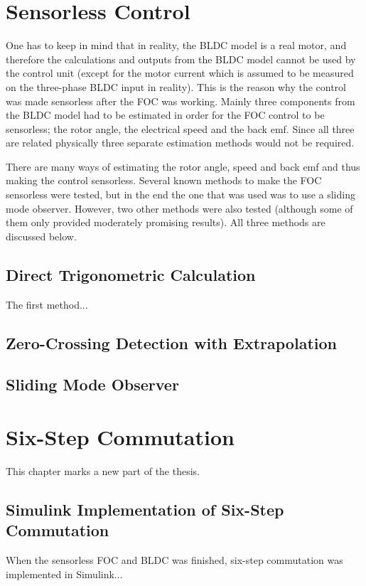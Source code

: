 \documentclass{LTHthesis}
\begin{document}
\chapter{Sensorless Control}
One has to keep in mind that in reality, the BLDC model is a real motor, and therefore the calculations and outputs from the BLDC model cannot be used by the control unit (except for the motor current which is assumed to be measured on the three-phase BLDC input in reality). This is the reason why the control was made sensorless after the FOC was working. Mainly three components from the BLDC model had to be estimated in order for the FOC control to be sensorless; the rotor angle, the electrical speed and the back emf. Since all three are related physically three separate estimation methods would not be required.

There are many ways of estimating the rotor angle, speed and back emf and thus making the control sensorless. Several known methods to make the FOC sensorless were tested, but in the end the one that was used was to use a sliding mode observer. However, two other methods were also tested (although some of them only provided moderately promising results). All three methods are discussed below.

\section{Direct Trigonometric Calculation}
The first method...

\section{Zero-Crossing Detection with Extrapolation}

\section{Sliding Mode Observer}
\cite{chi2007}


\chapter{Six-Step Commutation}
This chapter marks a new part of the thesis.

\section{Simulink Implementation of Six-Step Commutation}
When the sensorless FOC and BLDC was finished, six-step commutation was implemented in Simulink...
\end{document}
